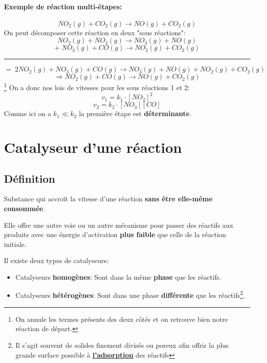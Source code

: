 \documentclass[10pt,a4paper]{book}
\begin{document}
\paragraph{Exemple de réaction multi-étapes:}
\[NO_2(g)+CO_2(g)\longrightarrow NO(g)+CO_2(g)\]
On peut décomposer cette réaction en deux "sous réactions":
\[NO_2(g)+NO_2(g)\longrightarrow NO_3(g)+NO(g) \tag*{1}\]
\[+ \; NO_3(g)+CO(g)\longrightarrow NO_2(g)+CO_2(g) \tag*{2}\]
\hrule
\[= \; 2NO_2(g)+NO_3(g)+CO(g) \longrightarrow NO_3(g)+NO(g)+NO_2(g)+CO_2(g)\]
\[\Rightarrow NO_2(g)+CO(g) \longrightarrow NO(g)+CO_2(g)\]\footnote{On annule les termes présents des deux côtés et on retrouve bien notre réaction de départ.}
On a donc nos lois de vitesses pour les sous réactions 1 et 2:
\[v_1 = k_1 \cdot [NO_2]^2\]
\[v_2 = k_2 \cdot [NO_3][CO]\]
Comme ici on a $k_1 \ll k_2$ la première étape est \textbf{déterminante}.

\section{Catalyseur d'une réaction}

\subsection{Définition}

Substance qui accroît la vitesse d’une réaction \textbf{sans être elle-même consommée}. \par
Elle offre une autre voie ou un autre mécanisme pour passer des réactifs aux produits avec une énergie d’activation \textbf{plus faible} que celle de la réaction initiale. \par
Il existe deux types de catalyseurs:
\begin{itemize}
\item Catalyseurs \textbf{homogènes}: Sont dans la même \textbf{phase} que les réactifs.
\item Catalyseurs \textbf{hétérogènes}: Sont dans une phase \textbf{différente} que les réactifs\footnote{Il s'agit souvent de solides finement divisés ou poreux afin offrir la plus grande surface possible à \href{https://fr.wikipedia.org/wiki/Adsorption}{\textbf{l'adsorption}} des réactifs}.
\end{itemize}
\end{document}
